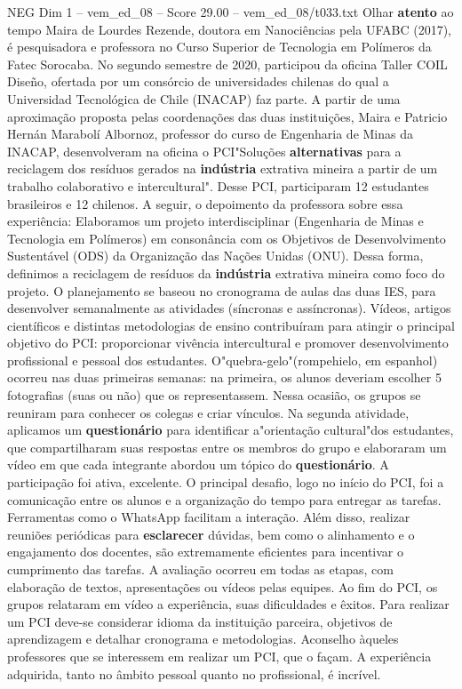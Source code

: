 \begin{textsample}{NEG Dim 1 – vem\_ed\_08 – Score 29.00 – vem\_ed\_08/t033.txt}  \label{ex:f1_neg_126}
Olhar \textbf{atento} ao tempo Maira de Lourdes Rezende, doutora em Nanociências pela UFABC (2017), é pesquisadora e professora no Curso Superior de Tecnologia em Polímeros da Fatec Sorocaba.
No segundo semestre de 2020, participou da oficina Taller COIL Diseño, ofertada por um consórcio de universidades chilenas do qual a Universidad Tecnológica de Chile (INACAP) faz parte.
A partir de uma aproximação proposta pelas coordenações das duas instituições, Maira e Patricio Hernán Marabolí Albornoz, professor do curso de Engenharia de Minas da INACAP, desenvolveram na oficina o PCI"Soluções \textbf{alternativas} para a reciclagem dos resíduos gerados na \textbf{indústria} extrativa mineira a partir de um trabalho colaborativo e intercultural".
Desse PCI, participaram 12 estudantes brasileiros e 12 chilenos.
A seguir, o depoimento da professora sobre essa experiência: Elaboramos um projeto interdisciplinar (Engenharia de Minas e Tecnologia em Polímeros) em consonância com os Objetivos de Desenvolvimento Sustentável (ODS) da Organização das Nações Unidas (ONU).
Dessa forma, definimos a reciclagem de resíduos da \textbf{indústria} extrativa mineira como foco do projeto.
O planejamento se baseou no cronograma de aulas das duas IES, para desenvolver semanalmente as atividades (síncronas e assíncronas).
Vídeos, artigos científicos e distintas metodologias de ensino contribuíram para atingir o principal objetivo do PCI: proporcionar vivência intercultural e promover desenvolvimento profissional e pessoal dos estudantes.
O"quebra-gelo"(rompehielo, em espanhol) ocorreu nas duas primeiras semanas: na primeira, os alunos deveriam escolher 5 fotografias (suas ou não) que os representassem.
Nessa ocasião, os grupos se reuniram para conhecer os colegas e criar vínculos.
Na segunda atividade, aplicamos um \textbf{questionário} para identificar a"orientação cultural"dos estudantes, que compartilharam suas respostas entre os membros do grupo e elaboraram um vídeo em que cada integrante abordou um tópico do \textbf{questionário}.
A participação foi ativa, excelente.
O principal desafio, logo no início do PCI, foi a comunicação entre os alunos e a organização do tempo para entregar as tarefas.
Ferramentas como o WhatsApp facilitam a interação.
Além disso, realizar reuniões periódicas para \textbf{esclarecer} dúvidas, bem como o alinhamento e o engajamento dos docentes, são extremamente eficientes para incentivar o cumprimento das tarefas.
A avaliação ocorreu em todas as etapas, com elaboração de textos, apresentações ou vídeos pelas equipes.
Ao fim do PCI, os grupos relataram em vídeo a experiência, suas dificuldades e êxitos.
Para realizar um PCI deve-se considerar idioma da instituição parceira, objetivos de aprendizagem e detalhar cronograma e metodologias.
Aconselho àqueles professores que se interessem em realizar um PCI, que o façam.
A experiência adquirida, tanto no âmbito pessoal quanto no profissional, é incrível.

\end{textsample}
